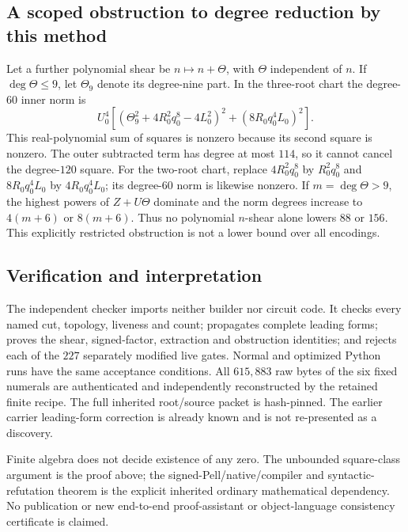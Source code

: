 \subsection{A scoped obstruction to degree reduction by this method}
Let a further polynomial shear be $n\mapsto n+\Theta$, with $\Theta$ independent of $n$.
If $\deg\Theta\le9$, let $\Theta_9$ denote its degree-nine part. In the three-root
chart the degree-$60$ inner norm is
\[
 U_0^4\left[
 (\Theta_9^2+4R_0^2q_0^8-4L_0^2)^2+(8R_0q_0^4L_0)^2
 \right].
\]
This real-polynomial sum of squares is nonzero because its second square is
nonzero. The outer subtracted term has degree at most $114$, so it cannot
cancel the degree-$120$ square. For the two-root chart, replace $4R_0^2q_0^8$
by $R_0^2q_0^8$ and $8R_0q_0^4L_0$ by $4R_0q_0^4L_0$; its degree-$60$
norm is likewise nonzero. If $m=\deg\Theta>9$, the highest powers of $Z+U\Theta$
dominate and the norm degrees increase to $4(m+6)$ or $8(m+6)$.
Thus no polynomial $n$-shear alone lowers $88$ or $156$. This explicitly
restricted obstruction is not a lower bound over all encodings.

\subsection{Verification and interpretation}
The independent checker imports neither builder nor circuit code. It checks
every named cut, topology, liveness and count; propagates complete leading
forms; proves the shear, signed-factor, extraction and obstruction identities;
and rejects each of the $227$ separately modified live gates. Normal and
optimized Python runs have the same acceptance conditions. All $615{,}883$
raw bytes of the six fixed numerals are authenticated and independently
reconstructed by the retained finite recipe. The full inherited root/source
packet is hash-pinned. The earlier carrier leading-form correction is already
known and is not re-presented as a discovery.

Finite algebra does not decide existence of any zero. The unbounded
square-class argument is the proof above; the signed-Pell/native/compiler
and syntactic-refutation theorem is the explicit inherited ordinary
mathematical dependency. No publication or new end-to-end proof-assistant
or object-language consistency certificate is claimed.

